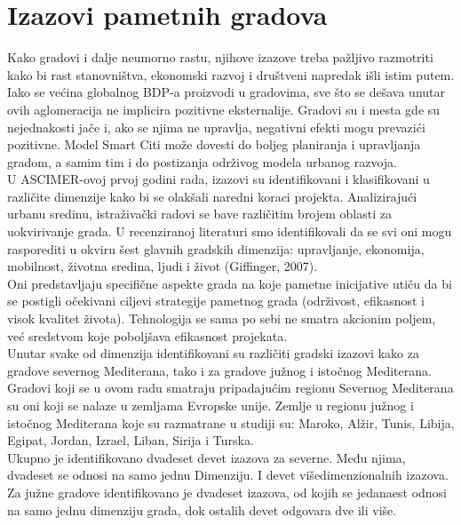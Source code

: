 \documentclass[a4paper,12pt]{article}
\begin{document}
{\section{Izazovi pametnih gradova}	
\label{sec:termini_i_citiranje}

 Kako gradovi i dalje neumorno rastu, njihove izazove treba pažljivo razmotriti kako bi rast stanovništva, ekonomski razvoj i društveni napredak išli istim putem. Iako se većina globalnog BDP-a proizvodi u gradovima, sve što se dešava unutar ovih aglomeracija ne implicira pozitivne eksternalije. Gradovi su i mesta gde su nejednakosti jače i, ako se njima ne upravlja, negativni efekti mogu prevazići pozitivne. Model Smart Citi može dovesti do boljeg planiranja i upravljanja gradom, a samim tim i do postizanja održivog modela urbanog razvoja. \\

U ASCIMER-ovoj prvoj godini rada, izazovi su identifikovani i klasifikovani u različite dimenzije kako bi se olakšali naredni koraci projekta. Analizirajući urbanu sredinu, istraživački radovi se bave različitim brojem oblasti za uokvirivanje grada. U recenziranoj literaturi smo identifikovali da se svi oni mogu rasporediti u okviru šest glavnih gradskih dimenzija: upravljanje, ekonomija, mobilnost, životna sredina, ljudi i život (Giffinger, 2007). \\

Oni predstavljaju specifične aspekte grada na koje pametne inicijative utiču da bi se postigli očekivani ciljevi strategije pametnog grada (održivost, efikasnost i visok kvalitet života). Tehnologija se sama po sebi ne smatra akcionim poljem, već sredstvom koje poboljšava efikasnost projekata. \\

Unutar svake od dimenzija identifikovani su različiti gradski izazovi kako za gradove severnog Mediterana, tako i za gradove južnog i istočnog Mediterana. Gradovi koji se u ovom radu smatraju pripadajućim regionu Severnog Mediterana su oni koji se nalaze u zemljama Evropske unije. Zemlje u regionu južnog i istočnog Mediterana koje su razmatrane u studiji su: Maroko, Alžir, Tunis, Libija, Egipat, Jordan, Izrael, Liban, Sirija i Turska. \\

Ukupno je identifikovano dvadeset devet izazova za severne. Među njima, dvadeset se odnosi na samo jednu Dimenziju. I devet višedimenzionalnih izazova. Za južne gradove identifikovano je dvadeset izazova, od kojih se jedanaest odnosi na samo jednu dimenziju grada, dok ostalih devet odgovara dve ili više.\\

}
\end{document}
